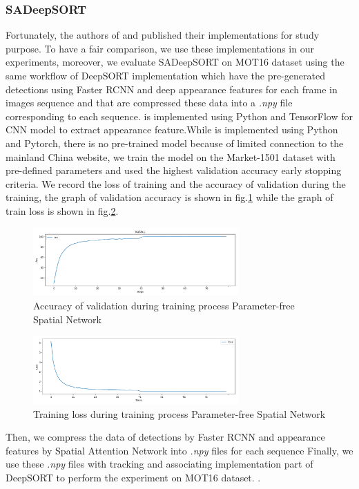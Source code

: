 \subsubsection{SADeepSORT}
\hspace{0.45cm}Fortunately, the authors of \cite{Wojke2017simple} and \cite{SA} published their implementations for study purpose.
To have a fair comparison, we use these implementations in our experiments, moreover, we evaluate SADeepSORT on MOT16\cite{Milan2016MOT16AB} dataset using the same 
workflow of DeepSORT implementation which have the pre-generated detections using Faster \acrshort{RCNN} and deep appearance features for each frame in images sequence and 
that are compressed these data into a \textit{.npy} file corresponding to each sequence.
\cite{Wojke2017simple} is implemented using Python and TensorFlow for \acrshort{CNN} model to extract appearance feature.While \cite{SA} is implemented using Python and Pytorch, 
there is no pre-trained model because of limited connection to the mainland China website, we train the model on the Market-1501 dataset with pre-defined parameters and used the highest validation accuracy early stopping criteria.
We record the loss of training and the accuracy of validation during the training, the graph of validation accuracy is shown in fig.\ref{fig:val_acc_sa_train} while the graph of train loss is shown in fig.\ref{fig:loss_train_sa_train}.\par
\begin{figure}[h!]
    \centering
    \includegraphics[width=0.7\textwidth]{Chapters/Fig/val_acc_sa_train.png}
    \caption{Accuracy of validation during training process Parameter-free Spatial Network}
    \label{fig:val_acc_sa_train}
\end{figure}
\begin{figure}[h!]
    \centering
    \includegraphics[width=0.7\textwidth]{Chapters/Fig/loss_train_sa.png}
    \caption{Training loss during training process Parameter-free Spatial Network}
    \label{fig:loss_train_sa_train}
\end{figure}
Then, we compress the data of detections by Faster \acrshort{RCNN}\cite{Wojke2017simple} and appearance features by Spatial Attention Network into \textit{.npy} files for each sequence
Finally, we use these \textit{.npy} files with tracking and associating implementation part of DeepSORT\cite{Wojke2017simple} to perform the experiment on MOT16 dataset.
.\par
